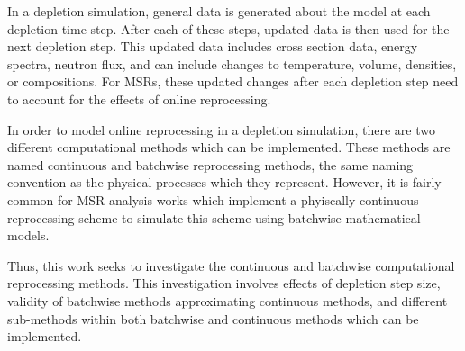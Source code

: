 In a depletion simulation, general data is generated about the model at each depletion time step. After each of these steps, updated data is then used for the next depletion step. This updated data includes cross section data, energy spectra, neutron flux, and can include changes to temperature, volume, densities, or compositions. For MSRs, these updated changes after each depletion step need to account for the effects of online reprocessing.

In order to model online reprocessing in a depletion simulation, there are two different computational methods which can be implemented. These methods are named continuous and batchwise reprocessing methods, the same naming convention as the physical processes which they represent. However, it is fairly common for MSR analysis works which implement a phyiscally continuous reprocessing scheme to simulate this scheme using batchwise mathematical models.

Thus, this work seeks to investigate the continuous and batchwise computational reprocessing methods. This investigation involves effects of depletion step size, validity of batchwise methods approximating continuous methods, and different sub-methods within both batchwise and continuous methods which can be implemented.

